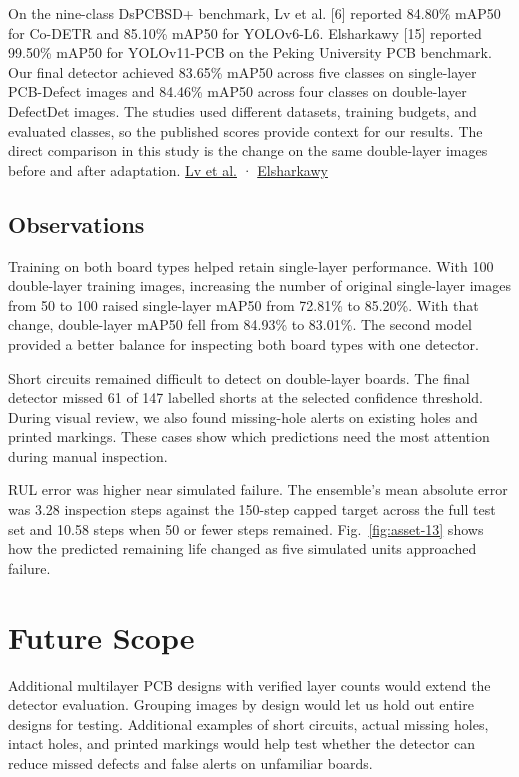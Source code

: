 \documentclass[conference]{IEEEtran}
\begin{document}
On the nine-class DsPCBSD+ benchmark, Lv et al. [6] reported 84.80\% mAP50 for Co-DETR and 85.10\% mAP50 for YOLOv6-L6. Elsharkawy [15] reported 99.50\% mAP50 for YOLOv11-PCB on the Peking University PCB benchmark. Our final detector achieved 83.65\% mAP50 across five classes on single-layer PCB-Defect images and 84.46\% mAP50 across four classes on double-layer DefectDet images. The studies used different datasets, training budgets, and evaluated classes, so the published scores provide context for our results. The direct comparison in this study is the change on the same double-layer images before and after adaptation. \href{https://pmc.ncbi.nlm.nih.gov/articles/PMC11263390/\#Tab2}{Lv et al.} · \href{https://doi.org/10.1038/s41598-025-27415-w}{Elsharkawy}

\subsection{Observations}

Training on both board types helped retain single-layer performance. With 100 double-layer training images, increasing the number of original single-layer images from 50 to 100 raised single-layer mAP50 from 72.81\% to 85.20\%. With that change, double-layer mAP50 fell from 84.93\% to 83.01\%. The second model provided a better balance for inspecting both board types with one detector.

Short circuits remained difficult to detect on double-layer boards. The final detector missed 61 of 147 labelled shorts at the selected confidence threshold. During visual review, we also found missing-hole alerts on existing holes and printed markings. These cases show which predictions need the most attention during manual inspection.

RUL error was higher near simulated failure. The ensemble’s mean absolute error was 3.28 inspection steps against the 150-step capped target across the full test set and 10.58 steps when 50 or fewer steps remained. Fig.~\ref{fig:asset-13} shows how the predicted remaining life changed as five simulated units approached failure.

\section{Future Scope}

Additional multilayer PCB designs with verified layer counts would extend the detector evaluation. Grouping images by design would let us hold out entire designs for testing. Additional examples of short circuits, actual missing holes, intact holes, and printed markings would help test whether the detector can reduce missed defects and false alerts on unfamiliar boards.
\end{document}

